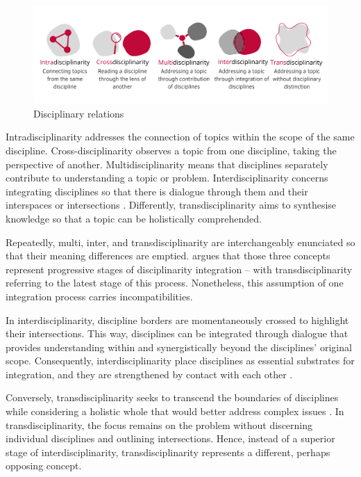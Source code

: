\documentclass[english]{textolivre}
\begin{document}
\begin{figure}[htbp]
\centering
\begin{minipage}{.9\textwidth}
 \includegraphics[width=\textwidth]{Fig3.png}
 \caption{Disciplinary relations}
 \label{fig3}
\end{minipage}
\end{figure}

Intradisciplinarity addresses the connection of topics within the scope of the same discipline. Cross-disciplinarity observes a topic from one discipline, taking the perspective of another. Multidisciplinarity means that disciplines separately contribute to understanding a topic or problem. Interdisciplinarity concerns integrating disciplines so that there is dialogue through them and their interspaces or intersections \cite{danermark_applied_2019}. Differently, transdisciplinarity aims to synthesise knowledge so that a topic can be holistically comprehended.

Repeatedly, multi, inter, and transdisciplinarity are interchangeably enunciated so that their meaning differences are emptied. \textcite{politi2019interdisciplinarity} argues that those three concepts represent progressive stages of disciplinarity integration – with transdisciplinarity referring to the latest stage of this process. Nonetheless, this assumption of one integration process carries incompatibilities.

In interdisciplinarity, discipline borders are momentaneously crossed to highlight their intersections. This way, disciplines can be integrated through dialogue that provides understanding within and synergistically beyond the disciplines’ original scope. Consequently, interdisciplinarity place disciplines as essential substrates for integration, and they are strengthened by contact with each other \cite{boufleuer_interdisciplinaridade_2020, florentino_disciplinaridade_2015}.

Conversely, transdisciplinarity seeks to transcend the boundaries of disciplines while considering a holistic whole that would better address complex issues \cite{guyotte_steam_2014}. In transdisciplinarity, the focus remains on the problem without discerning individual disciplines and outlining intersections. Hence, instead of a superior stage of interdisciplinarity, transdisciplinarity represents a different, perhaps opposing concept.
\end{document}
